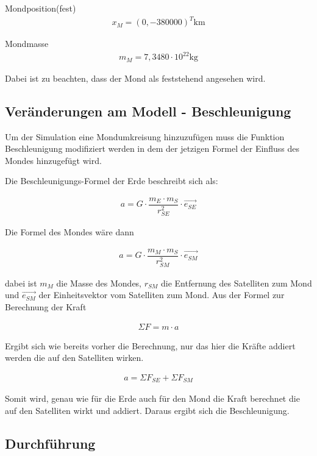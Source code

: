 \documentclass[]{scrartcl}
\begin{document}
Mondposition(fest)
\begin{align}
x_{M} = (0,-380000)^T \si{\km}
\end{align}

Mondmasse
\begin{align}
m_{M} = 7,3480 \cdot 10^{22} \si{\kg}
\end{align}

Dabei ist zu beachten, dass der Mond als feststehend angesehen wird.

\subsection{Veränderungen am Modell - Beschleunigung}
Um der Simulation eine Mondumkreisung hinzuzufügen muss die Funktion Beschleunigung modifiziert werden in dem der jetzigen Formel der Einfluss des Mondes hinzugefügt wird.

Die Beschleunigungs-Formel der Erde beschreibt sich als:

\begin{align}
a = G \cdot \dfrac{m_E \cdot m_S }{r^2_{SE}} \cdot \vec{e_{SE}}
\end{align}

Die Formel des Mondes wäre dann

\begin{align}
a = G \cdot \dfrac{m_M \cdot m_S }{r^2_{SM}} \cdot \vec{e_{SM}}
\end{align}

dabei ist $m_M$ die Masse des Mondes, $r_{SM}$ die Entfernung des Satelliten zum Mond und $ \vec{e_{SM}}$ der Einheitsvektor vom Satelliten zum Mond.
Aus der Formel zur Berechnung der Kraft

\begin{align}
\Sigma{F} = m \cdot a
\end{align}

Ergibt sich wie bereits vorher die Berechnung, nur das hier die Kräfte addiert werden die auf den Satelliten wirken.

\begin{align}
a = \Sigma{F}_{SE} + \Sigma{F}_{SM}
\end{align}

Somit wird, genau wie für die Erde auch für den Mond die Kraft berechnet die auf den Satelliten wirkt und addiert. Daraus ergibt sich die Beschleunigung.


\subsection{Durchführung}
\end{document}
